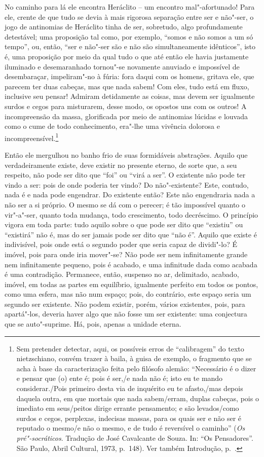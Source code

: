 No caminho para lá ele encontra Heráclito -- um encontro mal"-afortunado!
Para ele, crente de que tudo se devia à mais rigorosa separação entre
ser e não"-ser, o jogo de antinomias de Heráclito tinha de ser,
sobretudo, algo profundamente detestável; uma proposição tal como, por
exemplo, ``somos e não somos a um só tempo'', ou, então, ``ser e não"-ser
são e não são simultaneamente idênticos'', isto é, uma proposição por
meio da qual tudo o que até então ele havia justamente iluminado e
desemaranhado tornou"-se novamente anuviado e impossível de
desembaraçar, impeliram"-no à fúria: fora daqui com os homens, gritava
ele, que parecem ter duas cabeças, mas que nada sabem! Com eles, tudo
está em fluxo, inclusive seu pensar! Admiram detidamente as coisas, mas
devem ser igualmente surdos e cegos para misturarem, desse modo, os
opostos uns com os outros! A incompreensão da massa, glorificada por
meio de antinomias lúcidas e louvada como o cume de todo conhecimento,
era"-lhe uma vivência dolorosa e incompreensível.\footnote{ Sem pretender detectar, aqui, os possíveis erros de
``calibragem'' do texto nietzschiano, convém trazer à baila, à guisa de
exemplo, o fragmento que se acha à base da caracterização feita pelo
filósofo alemão: ``Necessário é o dizer e pensar que (o) ente é; pois é
ser,/e nada não é; isto eu te mando considerar./Pois primeiro desta
via de inquérito eu te afasto,/mas depois daquela outra, em que
mortais que nada sabem/erram, duplas cabeças, pois o imediato em seus/peitos
dirige errante pensamento; e são levados/como surdos e
cegos, perplexas, indecisas massas, para os quais ser e não ser é
reputado o mesmo/e não o mesmo, e de tudo é reversível o caminho''
(\textit{Os pré"-socráticos}. Tradução de José Cavalcante de Souza. In:
``Os Pensadores''. São Paulo, Abril Cultural, 1973, p.~148). 
Ver também Introdução, p.~\pageref{colli}.}

Então ele mergulhou no banho frio de suas formidáveis abstrações.
Aquilo que verdadeiramente existe, deve existir no presente eterno, de
sorte que, a seu respeito, não pode ser dito que ``foi'' ou ``virá a ser''.
O existente não pode ter vindo a ser: pois de onde poderia ter vindo?
Do não"-existente? Este, contudo, nada é e nada pode engendrar. Do
existente então? Este não engendraria nada a não ser a si próprio. O
mesmo se dá com o perecer; é tão impossível quanto o vir"-a"-ser, quanto
toda mudança, todo crescimento, todo decréscimo. O princípio vigora em
toda parte: tudo aquilo sobre o que pode ser dito que ``existiu'' ou
``existirá'' não é, mas do ser jamais pode ser dito que ``não é''. Aquilo
que existe é indivisível, pois onde está o segundo poder que seria
capaz de dividi"-lo? É imóvel, pois para onde iria mover"-se? Não pode
ser nem infinitamente grande nem infinitamente pequeno, pois é acabado,
e uma infinitude dada como acabada é uma contradição. Permanece, então,
suspenso no ar, delimitado, acabado, imóvel, em todas as partes em
equilíbrio, igualmente perfeito em todos os pontos, como uma esfera,
mas não num espaço; pois, do contrário, este espaço seria um segundo
ser existente. Não podem existir, porém, vários existentes, pois, para
apartá"-los, deveria haver algo que não fosse um ser existente: uma
conjectura que se auto"-suprime. Há, pois, apenas a unidade eterna.

